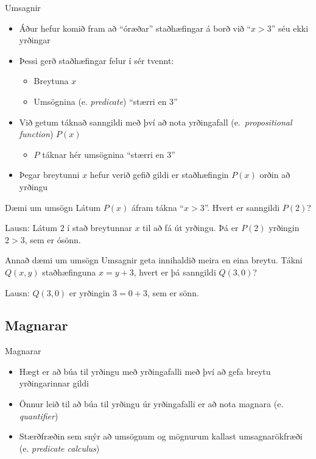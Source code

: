 \documentclass[handout]{beamer}
\begin{document}
\begin{frame}{Umsagnir}
\begin{itemize}
 \item Áður hefur komið fram að ``óræðar'' staðhæfingar á borð við ``$x > 3$'' séu ekki yrðingar
 \item Þessi gerð staðhæfingar felur í sér tvennt:
 \begin{itemize}
  \item Breytuna $x$
  \item Umsögnina (e. \emph{predicate}) ``stærri en 3''
 \end{itemize}
 \item Við getum táknað sanngildi með því að nota yrðingafall (e.\ \emph{propositional function}) $P(x)$
 \begin{itemize}
  \item $P$ táknar hér umsögnina ``stærri en 3''
 \end{itemize}
 \item Þegar breytunni $x$ hefur verið gefið gildi er staðhæfingin $P(x)$ orðin að yrðingu
\end{itemize}
\end{frame}

\begin{frame}{Dæmi um umsögn}
Látum $P(x)$ áfram tákna ``$x > 3$''. Hvert er sanngildi $P(2)$? \pause

\vspace{0.5cm}
Lausn: Látum $2$ í stað breytunnar $x$ til að fá út yrðingu. Þá er $P(2)$ yrðingin $2 > 3$, sem er ósönn.
\end{frame}

\begin{frame}{Annað dæmi um umsögn}
Umsagnir geta innihaldið meira en eina breytu. Tákni $Q(x, y)$ staðhæfinguna $x = y + 3$, hvert er þá sanngildi $Q(3, 0)$? \pause
\vspace{0.5cm}

Lausn: $Q(3, 0)$ er yrðingin $3 = 0 + 3$, sem er sönn.
\end{frame}

\subsection{Magnarar}

\begin{frame}{Magnarar}
\begin{itemize}
 \item Hægt er að búa til yrðingu með yrðingafalli með því að gefa breytu yrðingarinnar gildi
 \item Önnur leið til að búa til yrðingu úr yrðingafalli er að nota magnara (e. \emph{quantifier})
 \item Stærðfræðin sem snýr að umsögnum og mögnurum kallast umsagnarökfræði (e. \emph{predicate calculus})
\end{itemize}
\end{frame}
\end{document}
